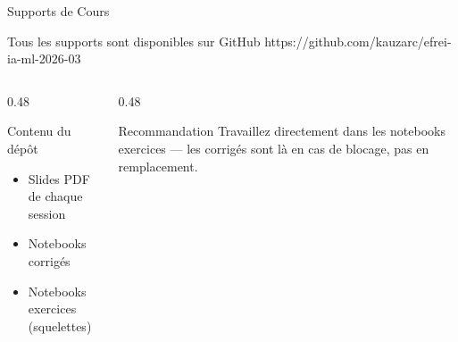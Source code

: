 \documentclass[aspectratio=169, 10pt]{beamer}
\begin{document}
\begin{frame}{Supports de Cours}
  \begin{center}
    \begin{exampleblock}{\centering Tous les supports sont disponibles sur GitHub}
      \centering\vspace{4pt}
      \Large\ttfamily https://github.com/kauzarc/efrei-ia-ml-2026-03
      \vspace{4pt}
    \end{exampleblock}
  \end{center}
  \vspace{4pt}
  \begin{columns}[T]
    \begin{column}{0.48\textwidth}
      \begin{block}{Contenu du dépôt}
        \begin{itemize}
          \item Slides PDF de chaque session
          \item Notebooks corrigés
          \item Notebooks exercices (squelettes)
        \end{itemize}
      \end{block}
    \end{column}
    \begin{column}{0.48\textwidth}
      \begin{alertblock}{Recommandation}
        Travaillez directement dans les notebooks
        exercices --- les corrigés sont là en cas
        de blocage, pas en remplacement.
      \end{alertblock}
    \end{column}
  \end{columns}
\end{frame}
\end{document}

